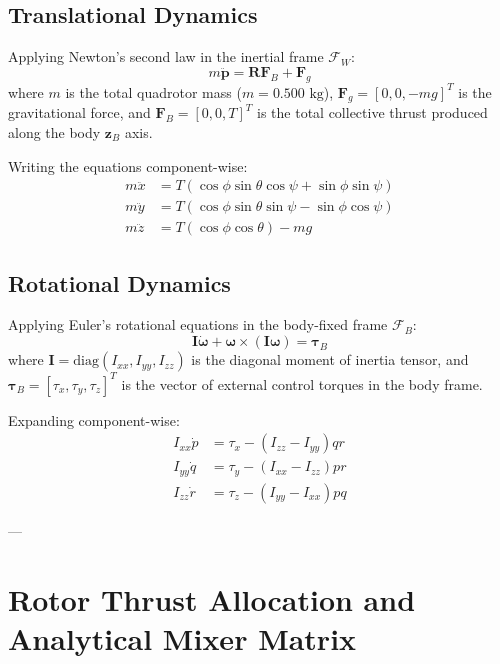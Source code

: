 \documentclass[11pt,a4paper]{article}
\begin{document}
\subsection{Translational Dynamics}
Applying Newton's second law in the inertial frame $\mathcal{F}_W$:
\begin{equation}
m \ddot{\mathbf{p}} = \mathbf{R} \mathbf{F}_B + \mathbf{F}_g
\end{equation}
where $m$ is the total quadrotor mass ($m = 0.500\text{ kg}$), $\mathbf{F}_g = [0, 0, -mg]^T$ is the gravitational force, and $\mathbf{F}_B = [0, 0, T]^T$ is the total collective thrust produced along the body $\mathbf{z}_B$ axis.

Writing the equations component-wise:
\begin{align}
m \ddot{x} &= T (\cos\phi \sin\theta \cos\psi + \sin\phi \sin\psi) \\
m \ddot{y} &= T (\cos\phi \sin\theta \sin\psi - \sin\phi \cos\psi) \\
m \ddot{z} &= T (\cos\phi \cos\theta) - mg
\end{align}

\subsection{Rotational Dynamics}
Applying Euler's rotational equations in the body-fixed frame $\mathcal{F}_B$:
\begin{equation}
\mathbf{I} \dot{\boldsymbol{\omega}} + \boldsymbol{\omega} \times (\mathbf{I} \boldsymbol{\omega}) = \boldsymbol{\tau}_B
\end{equation}
where $\mathbf{I} = \text{diag}(I_{xx}, I_{yy}, I_{zz})$ is the diagonal moment of inertia tensor, and $\boldsymbol{\tau}_B = [\tau_x, \tau_y, \tau_z]^T$ is the vector of external control torques in the body frame.

Expanding component-wise:
\begin{align}
I_{xx} \dot{p} &= \tau_x - (I_{zz} - I_{yy}) q r \\
I_{yy} \dot{q} &= \tau_y - (I_{xx} - I_{zz}) p r \\
I_{zz} \dot{r} &= \tau_z - (I_{yy} - I_{xx}) p q
\end{align}

---

\section{Rotor Thrust Allocation and Analytical Mixer Matrix}
\end{document}
